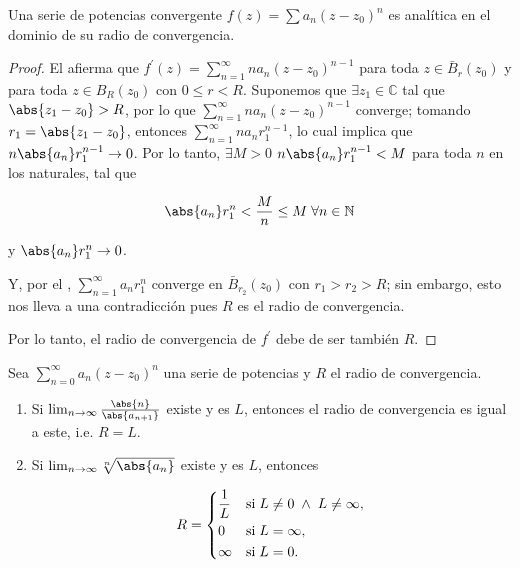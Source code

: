 \documentclass[../main.tex]{subfiles}
\begin{document}
\begin{remark}
    Una serie de potencias convergente \(f(z) = \sum a_{n}(z - z_{0})^{n}\) es analítica
    en el dominio de su radio de convergencia.
\end{remark}

\begin{proof}
    El afierma que
    \(f^{\prime}(z) = \sum_{n = 1}^{\infty}n a_{n}(z - z_{0})^{n - 1}\) para toda \(z\in
    \bar{B}_{r}(z_{0})\) y para toda \(z\in B_{R}(z_{0})\) con \(0 \leq r < R\).
    Suponemos que \(\exists z_{1}\in \mathbb{C}\) tal que \(\abs{z_{1} - z_{0}} > R\),
    por lo que \(\sum_{n = 1}^{\infty}n a_{n}(z - z_{0})^{n - 1}\) converge; tomando
    \(r_{1} = \abs{z_{1} - z_{0}}\), entonces \(\sum_{n = 1}^{\infty}n a_{n}r_{1}^{n -
    1}\), lo cual implica que \(n \abs{a_{n}}r_{1}^{n - 1} \to 0\). Por lo tanto,
    \(\exists M > 0\) \(n \abs{a_{n}}r_{1}^{n - 1} < M\) para toda \(n\) en
    los naturales, tal que

    \begin{equation*}
        \abs{a_{n}}r_{1}^{n} < \dfrac{M}{n} \leq M\; \forall n\in \mathbb{N}
    \end{equation*}

    y \(\abs{a_{n}}r_{1}^{n} \to 0\).

    Y, por el , \(\sum_{n =
    1}^{\infty}a_{n}r_{1}^{n}\) converge en \(\bar{B}_{r_{2}}(z_{0})\) con \(r_{1} >
    r_{2} > R\); sin embargo, esto nos lleva a una contradicción pues \(R\) es el
    radio de convergencia.

    Por lo tanto, el radio de convergencia de \(f^{\prime}\) debe de ser también \(R\).
\end{proof}

\begin{theorem}
    Sea \(\sum_{n = 0}^{\infty}a_{n}(z - z_{0})^{n}\) una serie de potencias y \(R\) el
    radio de convergencia.

    \begin{enumerate}
        \item Si \(\lim_{n \to \infty} \tfrac{\abs{n}}{\abs{a_{n + 1}}}\)
            existe y es \(L\),
            entonces el radio de convergencia es igual a este, i.e. \(R = L\).
        \item Si \(\lim_{n \to \infty} \sqrt[n]{\abs{a_{n}}}\) existe y es
            \(L\), entonces

            \begin{equation*}
                R =
                \begin{dcases}
                    \dfrac{1}{L} & \text{si}\; L \neq 0\; \wedge\; L \neq \infty,\\
                    0 & \text{si}\;  L = \infty,\\
                    \infty & \text{si}\; L = 0.
                \end{dcases}
            \end{equation*}
    \end{enumerate}
\end{theorem}
\end{document}
